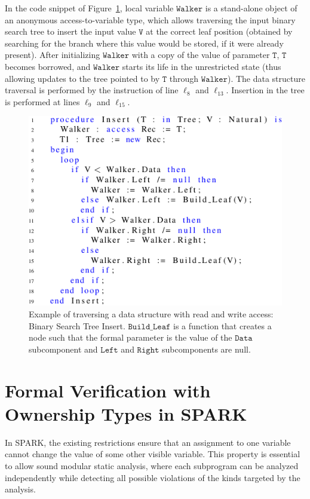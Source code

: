 \documentclass{llncs}
\newcommand\var[1]{\ensuremath{\mathtt{#1}}}
\begin{document}
In the code snippet of Figure~\ref{fig:treeInsert}, local variable \var{Walker} is a stand-alone object of an anonymous access-to-variable type, which allows traversing the input binary
search tree to insert the input value \var{V} at the correct leaf position (obtained by searching for the branch where this value would be stored, if it were already present).
After initializing \var{Walker} with a copy of the value of parameter \var{T}, \var{T} becomes borrowed, and \var{Walker} starts its life in the unrestricted state (thus allowing updates to the tree pointed to by \var{T} through \var{Walker}).
The data structure traversal is performed by the instruction of line $\ell_8$ and $\ell_{13}$. Insertion in the tree is performed at lines
$\ell_9$ and $\ell_{15}$.


\begin{figure}[htb!]
\centering
  \captionsetup{justification=centering,margin=0.6cm}
   \includegraphics[]{treeInsert}
   \caption{Example of traversing a data structure with read and write access: Binary Search Tree Insert. \var{Build\_Leaf} is a function that creates a node such that the formal
	parameter is the value of the \var{Data} subcomponent and \var{Left} and \var{Right} subcomponents are null.}
   \label{fig:treeInsert}
\end{figure}


\section{Formal Verification with Ownership Types in SPARK}

In SPARK, the existing restrictions ensure that an assignment to one variable cannot change the value of some other visible variable. This property is essential to allow sound modular static analysis,
where each subprogram can be analyzed independently while detecting all possible violations of the kinds targeted by the analysis.
\end{document}
